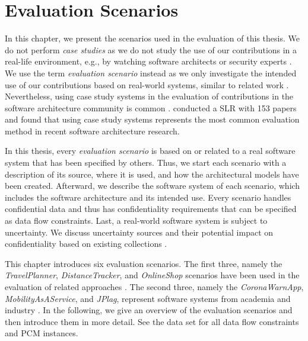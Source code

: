 \chapter{Evaluation Scenarios}%
\label{ch:evaluationscenarios}%


In this chapter, we present the scenarios used in the evaluation of this thesis.
We do not perform \emph{case studies} as we do not study the use of our contributions in a real-life environment, e.g., by watching software architects or security experts \cite{wohlin_case_2021}.
We use the term \emph{evaluation scenario} instead as we only investigate the intended use of our contributions based on real-world systems, similar to related work \cite{runeson_guidelines_2009,walter_context-based_2023}.
Nevertheless, using case study systems in the evaluation of contributions in the software architecture community is common \cite{walter_context-based_2023,seifermann_architectural_2022,busch_architecture-based_2020}.
\textcite{konersmann_evaluation_2022} conducted a \acf{SLR} with 153 papers and found that using case study systems represents the most common evaluation method in recent software architecture research.

In this thesis, every \emph{evaluation scenario} is based on or related to a real software system that has been specified by others.
Thus, we start each scenario with a description of its source, where it is used, and how the architectural models have been created.
Afterward, we describe the software system of each scenario, which includes the software architecture and its intended use.
Every scenario handles confidential data and thus has confidentiality requirements that can be specified as data flow constraints.
Last, a real-world software system is subject to uncertainty.
We discuss uncertainty sources and their potential impact on confidentiality based on existing collections \cite{hahner_classification_2023,ramirez_taxonomy_2012,hahner_arcn_2024}.

This chapter introduces six evaluation scenarios.
The first three, namely the \emph{TravelPlanner}, \emph{DistanceTracker}, and \emph{OnlineShop} scenarios have been used in the evaluation of related approaches \cite{walter_context-based_2023,seifermann_architectural_2022,seifermann_detecting_2022,seifermann_data-driven_2019,kunz_efficient_2018,weimann_automated_2017,walter_architectural_2022-1,walter_architecture-based_2023,walter_tool-based_2023,kramer_model-driven_2017}.
The second three, namely the \emph{CoronaWarnApp}, \emph{MobilityAsAService}, and \emph{JPlag}, represent software systems from academia \cite{leinweber_leveraging_2023,prechelt_finding_2002,saglam_automated_2024,saglam_detecting_2024,saglam_obfuscation-resilient_2024,saglam_token-based_2022} and industry \cite{robert_koch_institute_open-source_2020,enaya_case_2024}.
In the following, we give an overview of the evaluation scenarios and then introduce them in more detail.
See the data set \cite{dataset} for all data flow constraints and \acf{PCM} instances.

